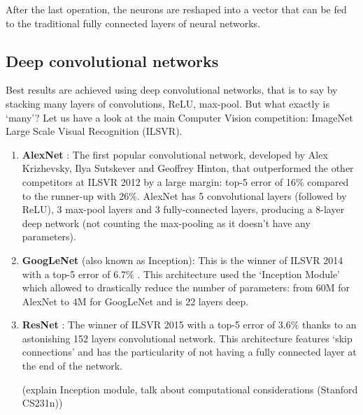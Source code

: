 After the last operation, the neurons are reshaped into a vector that can be fed to the traditional fully connected layers of neural networks.

\subsection{Deep convolutional networks}
Best results are achieved using deep convolutional networks, that is to say by stacking many layers of convolutions, ReLU, max-pool. But what exactly is `many'? Let us have a look at the main Computer Vision competition: ImageNet Large Scale Visual Recognition (ILSVR).
\begin{enumerate}
\item \textbf{AlexNet} \cite{alexnet}: The first popular convolutional network, developed by Alex Krizhevsky, Ilya Sutskever and Geoffrey Hinton, that outperformed the other competitors at ILSVR 2012 by a large margin: top-5 error of 16\% compared to the runner-up with 26\%. AlexNet has 5 convolutional layers (followed by ReLU), 3 max-pool layers and 3 fully-connected layers, producing a 8-layer deep network (not counting the max-pooling as it doesn't have any parameters).
\item \textbf{GoogLeNet} (also known as Inception)\cite{googlenet}: This is the winner of ILSVR 2014 with a top-5 error of 6.7\% . This architecture used the `Inception Module' which allowed to drastically reduce the number of parameters: from 60M for AlexNet to 4M for GoogLeNet and is 22 layers deep.
\item \textbf{ResNet} \cite{resnet}: The winner of ILSVR 2015 with a top-5 error of 3.6\% thanks to an astonishing 152 layers convolutional network. This architecture features `skip connections' and has the particularity of not having a fully connected layer at the end of the network.


(explain Inception module, talk about computational considerations (Stanford CS231n))
\end{enumerate}


